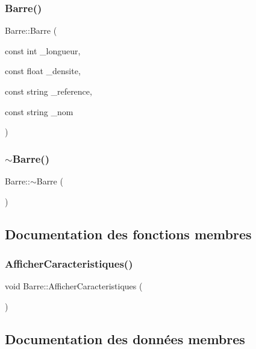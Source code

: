 \subsubsection{\texorpdfstring{Barre()}{Barre()}}
{\footnotesize\ttfamily Barre\+::\+Barre (\begin{DoxyParamCaption}\item[{const int}]{\+\_\+longueur,  }\item[{const float}]{\+\_\+densite,  }\item[{const string}]{\+\_\+reference,  }\item[{const string}]{\+\_\+nom }\end{DoxyParamCaption})}

\mbox{\label{class_barre_adc603c73952d56885cad1cc1acad578f}} 
\subsubsection{\texorpdfstring{$\sim$\+Barre()}{~Barre()}}
{\footnotesize\ttfamily Barre\+::$\sim$\+Barre (\begin{DoxyParamCaption}{ }\end{DoxyParamCaption})}



\subsection{Documentation des fonctions membres}
\mbox{\label{class_barre_a2e844be9d7c76a74d61cb14243a1bade}} 
\subsubsection{\texorpdfstring{Afficher\+Caracteristiques()}{AfficherCaracteristiques()}}
{\footnotesize\ttfamily void Barre\+::\+Afficher\+Caracteristiques (\begin{DoxyParamCaption}{ }\end{DoxyParamCaption})}



\subsection{Documentation des données membres}
\mbox{\label{class_barre_a1ed969f61782b23802f20ff7a5759f8d}} 
